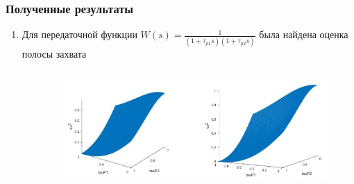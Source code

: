 \documentclass{beamer}
\begin{document}
\begin{frame}
\frametitle{Полученные результаты}
\begin{enumerate}
\item Для передаточной функции $W(s) = \frac{1}{(1+\tau_{p1}s)(1+\tau_{p2}s)}$
была найдена оценка полосы захвата
\begin{columns}[onlytextwidth]
\begin{column}{1mm}
\end{column}
\hfill
\begin{column}{.5\textwidth}
\begin{figure}
  \includegraphics[width=\textwidth]{images/agregated.jpg}
\end{figure}
\end{column}


\end{columns}
\end{enumerate}
\end{frame}
\end{document}
